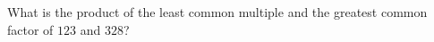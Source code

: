 What is the product of the least common multiple and the greatest common factor of $123$ and $328$?
